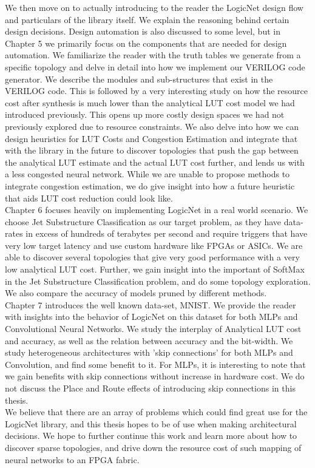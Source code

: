 We then move on to actually introducing to the reader the LogicNet design flow and particulars of the library itself. We explain the reasoning behind certain design decisions. Design automation is also discussed to some level, but in Chapter 5 we primarily focus on the components that are needed for design automation. We familiarize the reader with the truth tables we generate from a specific topology and delve in detail into how we implement our VERILOG code generator. We describe the modules and sub-structures that exist in the VERILOG code. This is followed by a very interesting study on how the resource cost after synthesis is much lower than the analytical LUT cost model we had introduced previously. This opens up more costly design spaces we had not previously explored due to resource constraints. We also delve into how we can design heuristics for LUT Costs and Congestion Estimation and integrate that with the library in the future to discover topologies that push the gap between the analytical LUT estimate and the actual LUT cost further, and lends us with a less congested neural network. While we are unable to propose methods to integrate congestion estimation, we do give insight into how a future heuristic that aids LUT cost reduction could look like.\\
Chapter 6 focuses heavily on implementing LogicNet in a real world scenario. We choose Jet Substructure Classification as our target problem, as they have data-rates in excess of hundreds of terabytes per second and require triggers that have very low target latency and use custom hardware like FPGAs or ASICs. We are able to discover several topologies that give very good performance with a very low analytical LUT cost. Further, we gain insight into the important of SoftMax in the Jet Substructure Classification problem, and do some topology exploration. We also compare the accuracy of models pruned by different methods.\\
Chapter 7 introduces the well known data-set, MNIST. We provide the reader with insights into the behavior of LogicNet on this dataset for both MLPs and Convolutional Neural Networks. We study the interplay of Analytical LUT cost and accuracy, as well as the relation between accuracy and the bit-width. We study heterogeneous architectures with 'skip connections' for both MLPs and Convolution, and find some benefit to it. For MLPs, it is interesting to note that we gain benefits with skip connections without increase in hardware cost. We do not discuss the Place and Route effects of introducing skip connections in this thesis. \\
We believe that there are an array of problems which could find great use for the LogicNet library, and this thesis hopes to be of use when making architectural decisions. We hope to further continue this work and learn more about how to discover sparse topologies, and drive down the resource cost of such mapping of neural networks to an FPGA fabric. 


